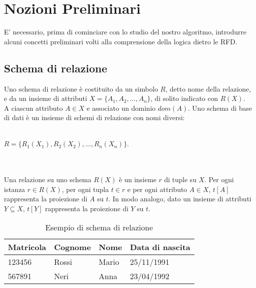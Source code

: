 \section{Nozioni Preliminari}
E' necessario, prima di cominciare con lo studio del nostro algoritmo, introdurre alcuni concetti preliminari volti alla comprensione della logica dietro le RFD.

\subsection{Schema di relazione}
Uno schema di relazione è costituito da un simbolo $R$, detto nome della relazione, e da un insieme di attributi $X = \{A_1,A_2,...,A_n\}$, di solito indicato
con $R(X)$. A ciascun attributo $A \in X$ e associato un dominio $dom(A)$.
Uno schema di base di dati è un insieme di schemi di relazione con nomi
diversi:
\\ \\
\centerline{$R = \{ R_1(X_1),R_2(X_2),\ldots,R_n(X_n)\}$.}
\\ \\
Una relazione su uno schema $R(X)$ è un insieme $r$ di tuple su $X$. Per
ogni istanza $r \in R(X)$, per ogni tupla $t \in r$ e per ogni attributo $A \in X$,
$t[A]$ rappresenta la proiezione di $A$ su $t$. In modo analogo, dato un insieme
di attributi $Y \subseteq X$, $t[Y]$ rappresenta la proiezione di $Y$ su $t$.\cite{libroCeri}
\\

\begin{table}[H]
    \centering
    \begin{tabular}{ | l | l | l | l |}
        \hline
        Matricola & Cognome & Nome & Data di nascita\\
        \hline
        123456 & Rossi & Mario & 25/11/1991 \\ 
        567891 & Neri & Anna & 23/04/1992 \\ 
        \hline
    \end{tabular}
    \caption{Esempio di schema di relazione}
    \label{tab:table example}
\end{table}

